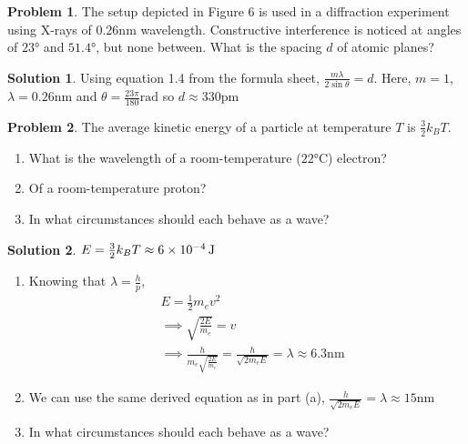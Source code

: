 \documentclass[10pt]{article}
\theoremstyle{definition}
\newtheorem{problem}{Problem}
\newtheorem{soln}{Solution}
\begin{document}
\begin{problem}
The setup depicted in Figure 6 is used in a diffraction experiment using X-rays of $0.26\unit{\nano\meter}$ wavelength. Constructive interference is noticed
at angles of $23\unit{\degree}$ and $51.4\unit{\degree}$, but none between. What is the spacing $d$ of atomic planes?
\end{problem}
\begin{soln}
  Using equation 1.4 from the formula sheet, $\frac{m\lambda}{2\sin\theta}=d$. Here, $m=1$, $\lambda=0.26\unit{\nano\meter}$ and $\theta=\frac{23\pi}{180}\unit{\radian}$ so $d\approx330\unit{\pico\meter}$
\end{soln}

\begin{problem}
The average kinetic energy of a particle at temperature $T$ is $\frac{3}{2}k_BT$.
\begin{enumerate}[label=(\alph*)]
  \item What is the wavelength of a room-temperature ($22\unit{\degreeCelsius}$) electron?
  \item Of a room-temperature proton?
  \item In what circumstances should each behave as a wave?
\end{enumerate}
\end{problem}
\begin{soln}
  $E=\frac{3}{2}k_BT\approx\qty{6d-4}{\joule}$
  \begin{enumerate}[label=(\alph*)]
    \item Knowing that $\lambda=\frac{h}{p}$,
    \begin{align*}
      & E=\frac{1}{2}m_ev^2\\
      & \implies \sqrt{\frac{2E}{m_e}}=v\\
      & \implies \frac{h}{m_e\sqrt{\frac{2E}{m_e}}}=\frac{h}{\sqrt{2m_eE}}=\lambda\approx6.3\unit{\nano\meter}
    \end{align*}
    \item We can use the same derived equation as in part (a), $\displaystyle\frac{h}{\sqrt{2m_eE}}=\lambda\approx15\unit{\nano\meter}$
    \item In what circumstances should each behave as a wave?
  \end{enumerate}
\end{soln}
\end{document}

